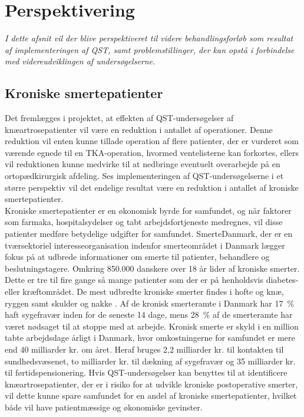 \section{Perspektivering}\label{perspektivering}
\textit{I dette afsnit vil der blive perspektiveret til videre behandlingsforløb som resultat af implementeringen af QST, samt problemstillinger, der kan opstå i forbindelse med videreudviklingen af undersøgelserne.}

\subsection{Kroniske smertepatienter}
Det fremlægges i projektet, at effekten af QST-undersøgelser af knæartrosepatienter  vil være en reduktion i antallet af operationer. Denne reduktion vil enten kunne tillade operation af flere patienter, der er vurderet som værende egnede til  en TKA-operation, hvormed ventelisterne kan forkortes, ellers vil reduktionen kunne medvirke til at nedbringe eventuelt overarbejde på en ortopædkirurgisk afdeling. Ses implementeringen af QST-undersøgelserne i et større perspektiv vil det endelige resultat være en reduktion i antallet af kroniske smertepatienter. \\
Kroniske smertepatienter er en økonomisk byrde for samfundet, og når faktorer som farmaka, hospitalsydelser og tabt arbejdsfortjeneste medregnes, vil disse patienter medføre betydelige udgifter for samfundet. SmerteDanmark, der er en tværsektoriel interesseorganisation indenfor smerteområdet i Danmark lægger fokus på at udbrede informationer om smerte til patienter, behandlere og beslutningstagere. Omkring 850.000 danskere over 18 år lider af kroniske smerter. Dette er tre til fire gange så mange patienter som der er på henholdsvis diabetes- eller kræftområdet. \citep{SmerteDanmark} De mest udbredte kroniske smerter findes i hofte og knæ, ryggen samt skulder og nakke \citep{SmerteDanmark1}. Af de kronisk smerteramte i Danmark har 17~\% haft sygefravær inden for de seneste 14 dage, mens 28~\% af de smerteramte har været nødsaget til at stoppe med at arbejde. Kronisk smerte er skyld i en million tabte arbejdsdage årligt i Danmark, hvor omkostningerne for samfundet er mere end 40 milliarder kr. om året. Heraf bruges 2,2 milliarder kr. til kontakten til sundhedsvæsenet, to milliarder kr. til dækning af sygefravær og 35 milliarder kr. til førtidspensionering. Hvis QST-undersøgelser kan benyttes til at identificere knæartrosepatienter, der er i risiko for at udvikle kroniske postoperative smerter, vil dette kunne spare samfundet for en andel af kroniske smertepatienter, hvilket både vil have patientmæssige og økonomiske gevinster. \citep{SmerteDanmark}

